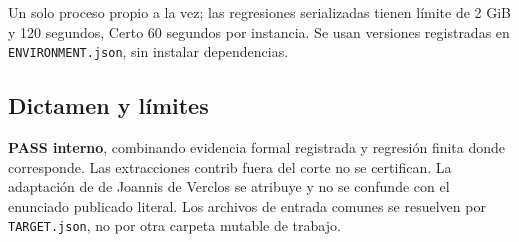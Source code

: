 Un solo proceso propio a la vez; las regresiones serializadas tienen
límite de 2 GiB y 120 segundos, Certo 60 segundos por instancia. Se usan
versiones registradas en \texttt{ENVIRONMENT.json}, sin instalar
dependencias.

\subsection{Dictamen y límites}\label{dictamen-y-luxedmites}

\textbf{PASS interno}, combinando evidencia formal registrada y
regresión finita donde corresponde. Las extracciones contrib fuera del
corte no se certifican. La adaptación de de Joannis de Verclos se
atribuye y no se confunde con el enunciado publicado literal. Los
archivos de entrada comunes se resuelven por \texttt{TARGET.json}, no
por otra carpeta mutable de trabajo.
